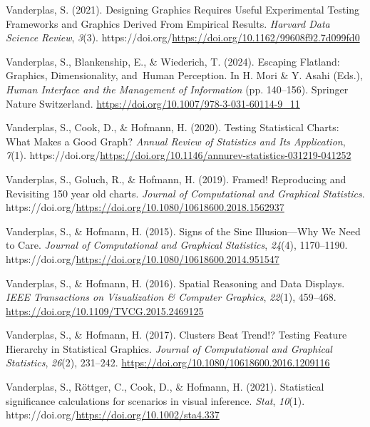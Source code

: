 \documentclass[
  10pt,
]{article}
\newlength{\cslhangindent}
\newenvironment{CSLReferences}[2] %
 {\begin{list}{}{%
  \setlength{\itemindent}{0pt}
  \setlength{\leftmargin}{0pt}
  \setlength{\parsep}{0pt}
  \ifodd #1
   \setlength{\leftmargin}{\cslhangindent}
   \setlength{\itemindent}{-1\cslhangindent}
  \fi
  \setlength{\itemsep}{#2\baselineskip}}}
 {\end{list}}
\begin{document}
\begin{CSLReferences}{1}{0}
Vanderplas, S. (2021). Designing {Graphics} {Requires} {Useful}
{Experimental} {Testing} {Frameworks} and {Graphics} {Derived} {From}
{Empirical} {Results}. \emph{Harvard Data Science Review}, \emph{3}(3).
https://doi.org/\url{https://doi.org/10.1162/99608f92.7d099fd0}

Vanderplas, S., Blankenship, E., \& Wiederich, T. (2024). Escaping
{Flatland}: {Graphics}, {Dimensionality}, and~{Human Perception}. In H.
Mori \& Y. Asahi (Eds.), \emph{Human {Interface} and the {Management} of
{Information}} (pp. 140--156). Springer Nature Switzerland.
\url{https://doi.org/10.1007/978-3-031-60114-9_11}

Vanderplas, S., Cook, D., \& Hofmann, H. (2020). Testing {Statistical}
{Charts}: {What} {Makes} a {Good} {Graph}? \emph{Annual Review of
Statistics and Its Application}, \emph{7}(1).
https://doi.org/\url{https://doi.org/10.1146/annurev-statistics-031219-041252}

Vanderplas, S., Goluch, R., \& Hofmann, H. (2019). Framed! {Reproducing}
and {Revisiting} 150 year old charts. \emph{Journal of Computational and
Graphical Statistics}.
https://doi.org/\url{https://doi.org/10.1080/10618600.2018.1562937}

Vanderplas, S., \& Hofmann, H. (2015). Signs of the {Sine}
{Illusion}---{Why} {We} {Need} to {Care}. \emph{Journal of Computational
and Graphical Statistics}, \emph{24}(4), 1170--1190.
https://doi.org/\url{https://doi.org/10.1080/10618600.2014.951547}

Vanderplas, S., \& Hofmann, H. (2016). Spatial {Reasoning} and {Data
Displays}. \emph{IEEE Transactions on Visualization \& Computer
Graphics}, \emph{22}(1), 459--468.
\url{https://doi.org/10.1109/TVCG.2015.2469125}

Vanderplas, S., \& Hofmann, H. (2017). Clusters {Beat} {Trend}!?
{Testing} {Feature} {Hierarchy} in {Statistical} {Graphics}.
\emph{Journal of Computational and Graphical Statistics}, \emph{26}(2),
231--242. \url{https://doi.org/10.1080/10618600.2016.1209116}

Vanderplas, S., Röttger, C., Cook, D., \& Hofmann, H. (2021).
Statistical significance calculations for scenarios in visual inference.
\emph{Stat}, \emph{10}(1).
https://doi.org/\url{https://doi.org/10.1002/sta4.337}


\end{CSLReferences}
\end{document}
